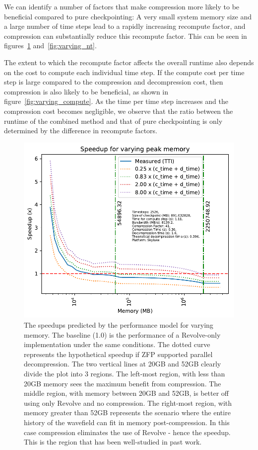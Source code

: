 \documentclass[conference]{IEEEtran}
\begin{document}
We can identify a number of factors that make compression more likely to be
beneficial compared to pure checkpointing: A very small system memory size and a
large number of time steps lead to a rapidly increasing recompute factor, and
compression can substantially reduce this recompute factor. This can be seen in
figures~\ref{fig:varying_memory} and~\ref{fig:varying_nt}.

The extent to which the recompute factor affects the overall runtime also
depends on the cost to compute each individual time step. If the compute cost
per time step is large compared to the compression and decompression cost, then
compression is also likely to be beneficial, as shown in
figure~\ref{fig:varying_compute}. As the time per time step increases and the
compression cost becomes negligible, we observe that the ratio between the runtime
of the combined method and that of pure checkpointing is only determined by the
difference in recompute factors.

\begin{figure}
\begin{center}
\includegraphics[width=\linewidth]{images/varying-memory.pdf}
\end{center}
\caption{The speedups predicted by the performance model for varying
  memory. The baseline
(1.0) is the performance of a Revolve-only implementation under the
same conditions. The dotted curve represents the hypothetical speedup
if ZFP supported parallel decompression. The two vertical lines at 20GB and 52GB clearly
divide the plot into 3 regions. The left-most region, with less than
20GB memory sees the maximum benefit from compression. The middle
region, with memory between 20GB and 52GB, is better off using only
Revolve and no compression. The right-most region, with memory greater
than 52GB represents the scenario where the entire history of the
wavefield can fit in memory post-compression. In this case compression
eliminates the use of Revolve - hence the speedup. This is the region
that has been well-studied in past work.}
\label{fig:varying_memory}
\end{figure}
\end{document}
